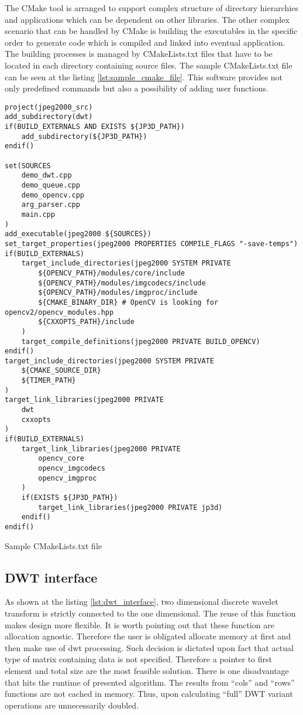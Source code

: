 The CMake tool is arranged to support complex structure of directory hierarchies and applications
which can be dependent on other libraries. The other complex scenario that can be handled by CMake
is building the executables in the specific order to generate code which is compiled and linked
into eventual application. The building processes is managed by CMakeLists.txt files that have
to be located in each directory containing source files. The sample CMakeLists.txt file can be
seen at the listing \ref{lst:sample_cmake_file}. This software provides not only predefined commands
but also a possibility of adding user functions.

\begin{listing}[!htb]
\begin{verbatim}
project(jpeg2000_src)
add_subdirectory(dwt)
if(BUILD_EXTERNALS AND EXISTS ${JP3D_PATH})
    add_subdirectory(${JP3D_PATH})
endif()

set(SOURCES
    demo_dwt.cpp
    demo_queue.cpp
    demo_opencv.cpp
    arg_parser.cpp
    main.cpp
)
add_executable(jpeg2000 ${SOURCES})
set_target_properties(jpeg2000 PROPERTIES COMPILE_FLAGS "-save-temps")
if(BUILD_EXTERNALS)
    target_include_directories(jpeg2000 SYSTEM PRIVATE
        ${OPENCV_PATH}/modules/core/include
        ${OPENCV_PATH}/modules/imgcodecs/include
        ${OPENCV_PATH}/modules/imgproc/include
        ${CMAKE_BINARY_DIR} # OpenCV is looking for opencv2/opencv_modules.hpp
        ${CXXOPTS_PATH}/include
    )
    target_compile_definitions(jpeg2000 PRIVATE BUILD_OPENCV)
endif()
target_include_directories(jpeg2000 SYSTEM PRIVATE
    ${CMAKE_SOURCE_DIR}
    ${TIMER_PATH}
)
target_link_libraries(jpeg2000 PRIVATE
    dwt
    cxxopts
)
if(BUILD_EXTERNALS)
    target_link_libraries(jpeg2000 PRIVATE
        opencv_core
        opencv_imgcodecs
        opencv_imgproc
    )
    if(EXISTS ${JP3D_PATH})
        target_link_libraries(jpeg2000 PRIVATE jp3d)
    endif()
endif()
\end{verbatim}
\caption{Sample CMakeLists.txt file}
\label{lst:sample_cmake_file}
\end{listing}

\subsection{DWT interface}

As shown at the listing \ref{lst:dwt_interface}, two dimensional discrete wavelet transform
is strictly connected to the one dimensional. The reuse of this function makes design more
flexible. It is worth pointing out that these function are allocation agnostic. Therefore
the user is obligated allocate memory at first and then make use of dwt processing. Such
decision is dictated upon fact that actual type of matrix containing data is not specified.
Therefore a pointer to first element and total size are the most feasible solution.
There is one disadvantage that hits the runtime of presented algorithm. The results
from ``cols'' and ``rows'' functions are not cached in memory. Thus, upon calculating
``full'' DWT variant operations are unnecessarily doubled.

